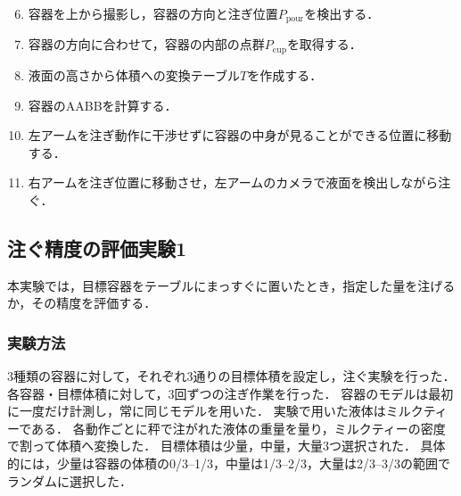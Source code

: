 	\vspace{3mm}
	\begin{enumerate}
		\setcounter{enumi}{5}
		\item 容器を上から撮影し，容器の方向と注ぎ位置$P_\mathrm{pour}$を検出する．
		\item 容器の方向に合わせて，容器の内部の点群$P_\mathrm{cup}$を取得する．
		\item 液面の高さから体積への変換テーブル$T$を作成する．\label{enum:TransformTable}
		\item 容器のAABBを計算する．\label{enum:calAABB}%
	\end{enumerate}
	
	\vspace{3mm}
	\begin{enumerate}
		\setcounter{enumi}{9}
		\item 左アームを注ぎ動作に干渉せずに容器の中身が見ることができる位置に移動する．\label{enum:pour-photographing}
		\item 右アームを注ぎ位置に移動させ，左アームのカメラで液面を検出しながら注ぐ．
	\end{enumerate}

	\subsection{注ぐ精度の評価実験1}\label{sec:Method1Exp-1}
	本実験では，目標容器をテーブルにまっすぐに置いたとき，指定した量を注げるか，その精度を評価する．
	
		\subsubsection{実験方法}
		3種類の容器に対して，それぞれ3通りの目標体積を設定し，注ぐ実験を行った．
		各容器・目標体積に対して，3回ずつの注ぎ作業を行った．
		容器のモデルは最初に一度だけ計測し，常に同じモデルを用いた．
		実験で用いた液体はミルクティーである．
		各動作ごとに秤で注がれた液体の重量を量り，ミルクティーの密度で割って体積へ変換した．
		目標体積は少量，中量，大量3つ選択された．
		具体的には，少量は容器の体積の0/3--1/3，中量は1/3--2/3，大量は2/3--3/3の範囲でランダムに選択した．
		
